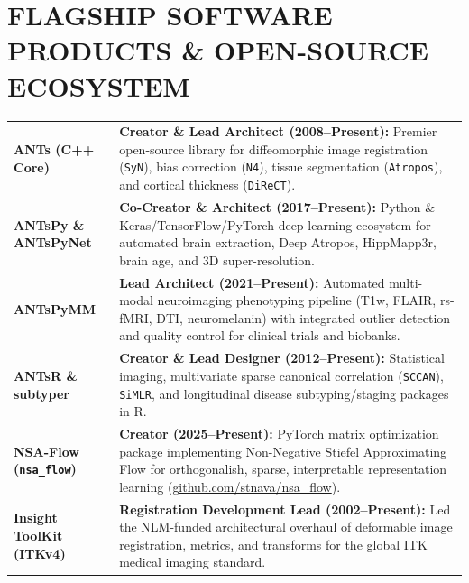 \documentclass[10pt,letterpaper]{article}
\begin{document}
\section{FLAGSHIP SOFTWARE PRODUCTS \& OPEN-SOURCE ECOSYSTEM}
{\footnotesize
\begin{tabularx}{\textwidth}{@{} >{\bfseries\color{primary}}p{1.35in} X @{}}
  ANTs (C++ Core) & \textbf{Creator \& Lead Architect (2008--Present):} Premier open-source library for diffeomorphic image registration (\texttt{SyN}), bias correction (\texttt{N4}), tissue segmentation (\texttt{Atropos}), and cortical thickness (\texttt{DiReCT}). \\[1.5pt]
  ANTsPy \& ANTsPyNet & \textbf{Co-Creator \& Architect (2017--Present):} Python \& Keras/TensorFlow/PyTorch deep learning ecosystem for automated brain extraction, Deep Atropos, HippMapp3r, brain age, and 3D super-resolution. \\[1.5pt]
  ANTsPyMM & \textbf{Lead Architect (2021--Present):} Automated multi-modal neuroimaging phenotyping pipeline (T1w, FLAIR, rs-fMRI, DTI, neuromelanin) with integrated outlier detection and quality control for clinical trials and biobanks. \\[1.5pt]
  ANTsR \& subtyper & \textbf{Creator \& Lead Designer (2012--Present):} Statistical imaging, multivariate sparse canonical correlation (\texttt{SCCAN}), \texttt{SiMLR}, and longitudinal disease subtyping/staging packages in R. \\[1.5pt]
  NSA-Flow (\texttt{nsa\_flow}) & \textbf{Creator (2025--Present):} PyTorch matrix optimization package implementing Non-Negative Stiefel Approximating Flow for orthogonalish, sparse, interpretable representation learning (\href{https://github.com/stnava/nsa_flow}{github.com/stnava/nsa\_flow}). \\[1.5pt]
  Insight ToolKit (ITKv4) & \textbf{Registration Development Lead (2002--Present):} Led the NLM-funded architectural overhaul of deformable image registration, metrics, and transforms for the global ITK medical imaging standard.
\end{tabularx}
\vspace{1pt}
}

\end{document}
